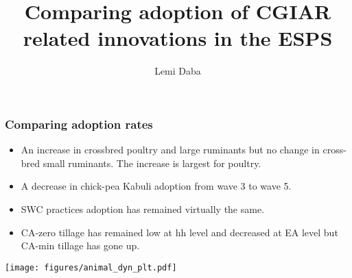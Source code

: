 \documentclass[11pt]{beamer}
\begin{document}
\author{Lemi Daba}
\title{Comparing adoption of CGIAR related innovations in the ESPS}
\begin{frame}[plain]
	\maketitle
\end{frame}

\begin{frame}
\frametitle{Comparing adoption rates}
\begin{itemize}
\item An increase in crossbred poultry and large ruminants but no change in cross-bred small ruminants. The increase is largest for poultry. 

\item A decrease in chick-pea Kabuli adoption from wave 3 to wave 5. 

\item SWC practices adoption has remained virtually the same.

\item CA-zero tillage has remained low at hh level and decreased at EA level but CA-min tillage has gone up.

\end{itemize}

\end{frame}


\begin{frame}
\texttt{[image: figures/animal\_dyn\_plt.pdf]}
\end{frame}
\end{document}
